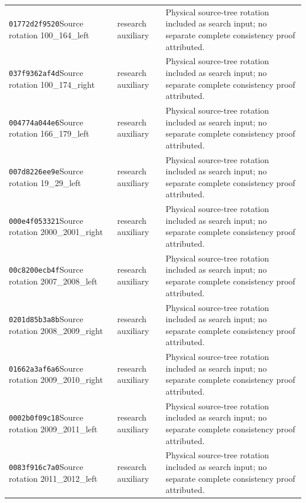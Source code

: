 {\begin{longtable}{@{}>{\raggedright\arraybackslash}p{}>{\raggedright\arraybackslash}p{}>{\raggedright\arraybackslash}p{}@{}}
\texttt{01772d2f9520}\newline Source rotation 100\_164\_left & research auxiliary & Physical source-tree rotation included as search input; no separate complete consistency proof attributed.\\
\texttt{037f9362af4d}\newline Source rotation 100\_174\_right & research auxiliary & Physical source-tree rotation included as search input; no separate complete consistency proof attributed.\\
\texttt{004774a044e6}\newline Source rotation 166\_179\_left & research auxiliary & Physical source-tree rotation included as search input; no separate complete consistency proof attributed.\\
\texttt{007d8226ee9e}\newline Source rotation 19\_29\_left & research auxiliary & Physical source-tree rotation included as search input; no separate complete consistency proof attributed.\\
\texttt{000e4f053321}\newline Source rotation 2000\_2001\_right & research auxiliary & Physical source-tree rotation included as search input; no separate complete consistency proof attributed.\\
\texttt{00c8200ecb4f}\newline Source rotation 2007\_2008\_left & research auxiliary & Physical source-tree rotation included as search input; no separate complete consistency proof attributed.\\
\texttt{0201d85b3a8b}\newline Source rotation 2008\_2009\_right & research auxiliary & Physical source-tree rotation included as search input; no separate complete consistency proof attributed.\\
\texttt{01662a3af6a6}\newline Source rotation 2009\_2010\_right & research auxiliary & Physical source-tree rotation included as search input; no separate complete consistency proof attributed.\\
\texttt{0002b0f09c18}\newline Source rotation 2009\_2011\_left & research auxiliary & Physical source-tree rotation included as search input; no separate complete consistency proof attributed.\\
\texttt{0083f916c7a0}\newline Source rotation 2011\_2012\_left & research auxiliary & Physical source-tree rotation included as search input; no separate complete consistency proof attributed.\\

\end{longtable}}
